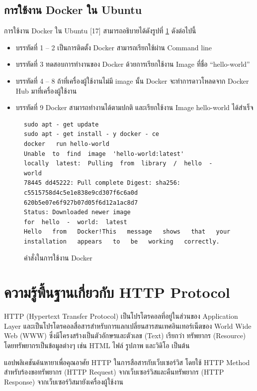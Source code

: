 	\subsection{การใช้งาน Docker ใน Ubuntu}
		การใช้งาน Docker ใน Ubuntu [17] สามารถอธิบายได้ดังรูปที่ \ref{Fig:UsingDocker} ดังต่อไปนี้
		\begin{itemize}[label={--}]
			\item บรรทัดที่ 1 – 2 เป็นการติดตั้ง Docker สามารถเรียกใช้ผ่าน Command line
			\item บรรทัดที่ 3 ทดสอบการทำงานของ Docker ด้วยการเรียกใช้งาน Image ที่ชื่อ “hello-world”
			\item บรรทัดที่ 4 – 8  ถ้าที่เครื่องผู้ใช้งานไม่มี image นั้น Docker จะทำการดาวโหลดจาก Docker Hub มาที่เครื่องผู้ใช้งาน 
			\item บรรทัดที่ 9 Docker สามารถทำงานได้ตามปกติ และเรียกใช้งาน Image hello-world ได้สำเร็จ
		\end{itemize}

		\begin{figure}[H]
			{\begin{lstlisting}
sudo apt - get update 
sudo apt - get install - y docker - ce   
docker   run hello-world   
Unable  to  find  image  'hello-world:latest'  
locally  latest:  Pulling  from  library  /  hello  -  world  
78445 dd45222: Pull complete Digest: sha256: c5515758d4c5e1e838e9cd307f6c6a0d 620b5e07e6f927b07d05f6d12a1ac8d7  
Status: Downloaded newer image  
for  hello  -  world:  latest  
Hello   from   Docker!This   message   shows   that   your   installation   appears   to   be   working   correctly. 
			\end{lstlisting}}
			\caption{คำสั่งในการใช้งาน Docker}
			\label{Fig:UsingDocker}
		\end{figure}
		

\section{ความรู้พื้นฐานเกี่ยวกับ HTTP Protocol}
	HTTP (Hypertext Transfer Protocol) เป็นโปรโตรคอลที่อยู่ในส่วนของ Application Layer 
	และเป็นโปรโตรคอลสื่อสารสำหรับการแลกเปลี่ยนสารสนเทศอินเทอร์เน็ตของ World Wide Web (WWW) 
	ซึ่งมีโครงสร้างเป็นตัวอักษรและตัวเลข (Text) เรียกว่า ทรัพยากร (Resource) 
	โดยทรัพยากรเป็นข้อมูลต่างๆ เช่น HTML ไฟล์ รูปภาพ และวิดิโอ เป็นต้น
	
	แอปพลิเคชันค้นหายาเพื่อคุณอาศัย HTTP ในการสือสารกับเว็บเซอร์วิส โดยใช้ HTTP Method สำหรับร้องขอทรัพยากร (HTTP Request) จากเว็บเซอร์วิสและคืนทรัพยากร (HTTP Response) จากเว็บเซอร์วิสมายังเครื่องผู้ใช้งาน 

